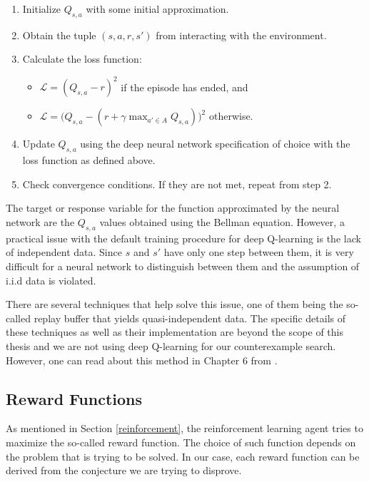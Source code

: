 \documentclass[11pt]{article}
\theoremstyle{definition}
\begin{document}
\begin{enumerate}
    \item Initialize $Q_{s, a}$ with some initial approximation.
    \item Obtain the tuple $(s, a, r, s')$ from interacting with the environment. 
    \item Calculate the loss function: 
    \begin{itemize}[label=\raisebox{0.25ex}{\tiny$\bullet$}]
        \item $\mathcal{L} = (Q_{s, a}  - r)^2$ if the episode has ended, and
        \item $\mathcal{L} = \Big(Q_{s, a}  - (r + \gamma \max_{a' \in A} Q_{s, a}) \Big)^2$ otherwise.
    \end{itemize}
    \item Update $Q_{s, a}$ using the deep neural network specification of choice with the loss function as defined above. 
    \item Check convergence conditions. If they are not met, repeat from step 2.
\end{enumerate}

The target or response variable for the function approximated by the neural network are the $Q_{s, a}$ values obtained using the Bellman equation. However, a practical issue with the default training procedure for deep Q-learning is the lack of independent data. Since $s$ and $s'$ have only one step between them, it is very difficult for a neural network to distinguish between them and the assumption of i.i.d data is violated. 

There are several techniques that help solve this issue, one of them being the so-called replay buffer that yields quasi-independent data. The specific details of these techniques as well as their implementation are beyond the scope of this thesis and we are not using deep Q-learning for our counterexample search. However, one can read about this method in Chapter 6 from \cite{Lapan:2020}.

\subsection{Reward Functions} \label{reward functions}

As mentioned in Section \ref{reinforcement}, the reinforcement learning agent tries to maximize the so-called reward function. The choice of such function depends on the problem that is trying to be solved. In our case, each reward function can be derived from the conjecture we are trying to disprove.
\end{document}
